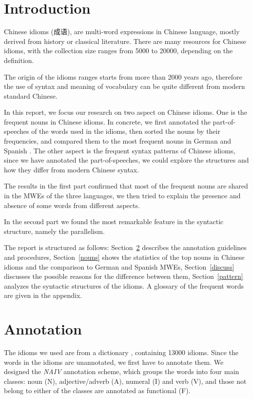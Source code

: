 \section{Introduction}
Chinese idioms (成语), are multi-word expressions in Chinese language, mostly derived from history or classical literature. There are many resources for Chinese idioms, with the collection size ranges from 5000 to 20000, depending on the definition.


The origin of the idioms ranges starts from more than 2000 years ago, therefore the use of syntax and meaning of vocabulary can be quite different from modern standard Chinese. 

In this report, we focus our research on two aspect on Chinese idioms.
One is the frequent nouns in Chinese idioms. In concrete, we first annotated the part-of-speeches of the words used in the idioms, then sorted the nouns by their frequencies, and compared them to the most frequent nouns in German and Spanish \citep{mahlow:2013, Duden:2008, Seco:2004}. 
The other aspect is the frequent syntax patterns of Chinese idioms, since we have annotated the part-of-speeches, we could explore the structures and how they differ from modern Chinese syntax.

The results in the first part confirmed that most of the frequent nouns are shared in the MWEs of the three languages, we then tried to explain the presence and absence of some words from different aspects.

In the second part we found the most remarkable feature in the syntactic structure, namely the parallelism. 

The report is structured as follows: Section~\ref{anno} describes the annotation guidelines and procedures, Section~\ref{nouns} shows the statistics of the top nouns in Chinese idioms and the comparison to German and Spanish MWEs, Section~\ref{discuss} discusses the possible reasons for the difference between them, Section~\ref{pattern} analyzes the syntactic structures of the idioms. A glossary of the frequent words are given in the appendix.

\section{Annotation}\label{anno}
The idioms we used are from a dictionary \citep{song:2014}, containing 13000 idioms. 
Since the words in the idioms are unannotated, we first have to annotate them. We designed the {\em NAIV} annotation scheme, which  groups the words into four main classes: noun (N), adjective/adverb (A), numeral (I) and verb (V), and those not belong to either of the classes are annotated as functional (F). 

